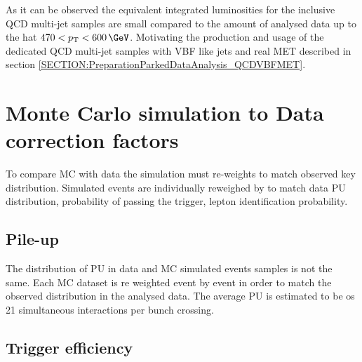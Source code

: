 As it can be observed the equivalent integrated luminosities for the inclusive \gls{QCD} multi-jet samples are small compared to the amount of analysed data up to the \pt hat $470<\pt<600\,\GeV$. Motivating the production and usage of the dedicated \gls{QCD} multi-jet samples with \gls{VBF} like jets and real \gls{MET} described in section \ref{SECTION:PreparationParkedDataAnalysis_QCDVBFMET}.

\clearpage

\section{Monte Carlo simulation to Data correction factors}


To compare \gls{MC} with data the simulation must re-weights to match observed key distribution. Simulated events are individually reweighed by  to match data \gls{PU} distribution, probability of passing the trigger, lepton identification probability.

\subsection{Pile-up}


The distribution of \gls{PU} in data and \gls{MC} simulated events samples is not the same. Each \gls{MC} dataset is re weighted event by event in order to match the observed distribution in the analysed data. The average \gls{PU} is estimated to be os 21 simultaneous interactions per bunch crossing. 

\subsection{Trigger efficiency}
\label{SUBSECTION:ParkedDataAnalysis_CorrectionFactors_TriggerEfficiency}

